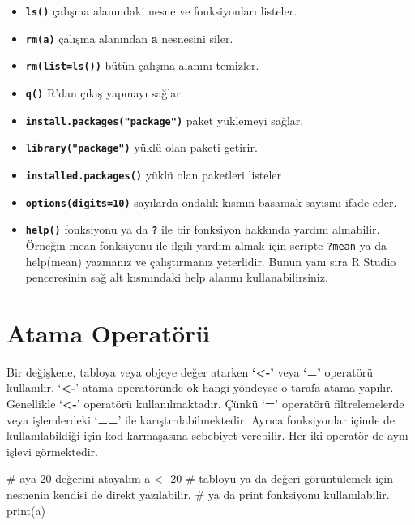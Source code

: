 \documentclass[
  letterpaper,
  DIV=11,
  numbers=noendperiod]{scrreprt}
\newenvironment{Shaded}{\begin{snugshade}}{\end{snugshade}}
\newcommand{\CommentTok}[1]{\textcolor[rgb]{0.37,0.37,0.37}{#1}}
\newcommand{\DecValTok}[1]{\textcolor[rgb]{0.68,0.00,0.00}{#1}}
\newcommand{\FunctionTok}[1]{\textcolor[rgb]{0.28,0.35,0.67}{#1}}
\newcommand{\NormalTok}[1]{\textcolor[rgb]{0.00,0.23,0.31}{#1}}
\newcommand{\OtherTok}[1]{\textcolor[rgb]{0.00,0.23,0.31}{#1}}
\begin{document}
\begin{itemize}
\item
  \textbf{\texttt{ls()}} çalışma alanındaki nesne ve fonksiyonları
  listeler.
\item
  \textbf{\texttt{rm(a)}} çalışma alanından \textbf{a} nesnesini siler.
\item
  \textbf{\texttt{rm(list=ls())}} bütün çalışma alanını temizler.
\item
  \textbf{\texttt{q()}} R'dan çıkış yapmayı sağlar.
\item
  \textbf{\texttt{install.packages("package")}} paket yüklemeyi sağlar.
\item
  \textbf{\texttt{library("package")}} yüklü olan paketi getirir.
\item
  \textbf{\texttt{installed.packages()}} yüklü olan paketleri listeler
\item
  \textbf{\texttt{options(digits=10)}} sayılarda ondalık kısmın basamak
  sayısını ifade eder.
\item
  \textbf{\texttt{help()}} fonksiyonu ya da \textbf{\texttt{?}} ile bir
  fonksiyon hakkında yardım alınabilir. Örneğin mean fonksiyonu ile
  ilgili yardım almak için scripte \texttt{?mean} ya da help(mean)
  yazmanız ve çalıştırmanız yeterlidir. Bunun yanı sıra R Studio
  penceresinin sağ alt kısmındaki help alanını kullanabilirsiniz.
\end{itemize}

\section{Atama Operatörü}\label{atama-operatuxf6ruxfc}

Bir değişkene, tabloya veya objeye değer atarken \textbf{`\textless-'}
veya \textbf{`='} operatörü kullanılır. `\textbf{\textless-}' atama
operatöründe ok hangi yöndeyse o tarafa atama yapılır. Genellikle
`\textbf{\textless-}' operatörü kullanılmaktadır. Çünkü `\textbf{=}'
operatörü filtrelemelerde veya işlemlerdeki `\textbf{==}' ile
karıştırılabilmektedir. Ayrıca fonksiyonlar içinde de kullanılabildiği
için kod karmaşasına sebebiyet verebilir. Her iki operatör de aynı
işlevi görmektedir.

\begin{Shaded}
\begin{Highlighting}[]
\CommentTok{\# a\textquotesingle{}ya 20 değerini atayalım  }
\NormalTok{a }\OtherTok{\textless{}{-}} \DecValTok{20}    
\CommentTok{\# tabloyu ya da değeri görüntülemek için nesnenin kendisi de direkt yazılabilir.  }
\CommentTok{\# ya da print fonksiyonu kullanılabilir.   }
\FunctionTok{print}\NormalTok{(a)    }
\end{Highlighting}
\end{Shaded}
\end{document}
